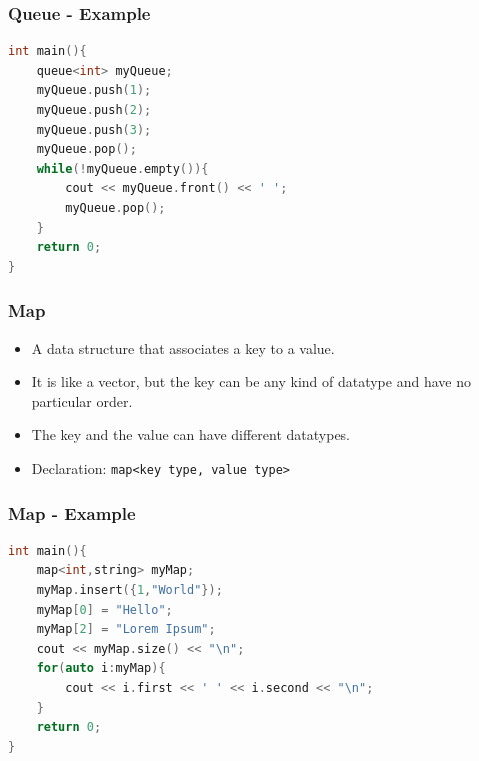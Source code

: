 \documentclass{beamer}
\begin{document}
\begin{frame}[fragile]
    \frametitle{Queue - Example}

    \begin{lstlisting}[language=C++]
int main(){
    queue<int> myQueue;
    myQueue.push(1);
    myQueue.push(2);
    myQueue.push(3);
	myQueue.pop();
	while(!myQueue.empty()){
        cout << myQueue.front() << ' ';
        myQueue.pop();
    }
    return 0;
}
    \end{lstlisting}

    \begin{tcolorbox}[title=Output,fontupper=\scriptsize,fonttitle=\scriptsize]
    \end{tcolorbox}
\end{frame}

\begin{frame}
    \frametitle{Map}

    \begin{itemize}
        \item A data structure that associates a key to a value.
        \item It is like a vector, but the key can be any kind of datatype and have no particular order.
        \item The key and the value can have different datatypes.
        \item Declaration: \texttt{map<key type, value type>}
    \end{itemize}

\end{frame}

\begin{frame}[fragile]
    \frametitle{Map - Example}

    \begin{lstlisting}[language=C++, basicstyle = \scriptsize\ttfamily]
int main(){
    map<int,string> myMap;
    myMap.insert({1,"World"});
    myMap[0] = "Hello";
    myMap[2] = "Lorem Ipsum";
    cout << myMap.size() << "\n";
    for(auto i:myMap){
        cout << i.first << ' ' << i.second << "\n";
    }
    return 0;
}
    \end{lstlisting}

    \begin{tcolorbox}[title=Output,fontupper=\scriptsize,fonttitle=\scriptsize]
    \end{tcolorbox}
\end{frame}
\end{document}
